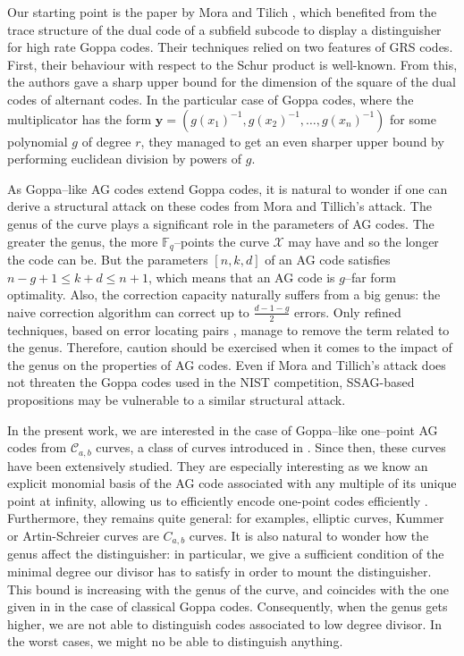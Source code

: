 \documentclass[a4paper]{article}
\theoremstyle{definition}
\theoremstyle{remark}
\newcommand{\calC}{\mathcal{C}}
\newcommand{\calX}{\mathcal{X}}
\newcommand{\F}{\mathbb{F}}
\begin{document}
Our starting point is the paper by Mora and Tilich \cite{MT21}, which benefited from the trace structure of the dual code of a subfield subcode to display a distinguisher for high rate Goppa codes. Their techniques relied on two features of GRS codes. First, their behaviour with respect to the Schur product is well-known. From this, the authors gave a sharp upper bound for the dimension of the square of the dual codes of alternant codes. In the particular case of Goppa codes, where the multiplicator has the form $\mathbf{y}=(g(x_1)^{-1},g(x_2)^{-1},\dots,g(x_n)^{-1})$ for some polynomial $g$ of degree $r$, they managed to get an even sharper upper bound by performing euclidean division by powers of $g$.

As Goppa--like AG codes extend Goppa codes, it is natural to wonder if one can derive a structural attack on these codes from Mora and Tillich's attack. The genus of the curve plays a significant role in the parameters of AG codes. The greater the genus, the more $\F_q$--points the curve $\calX$ may have and so the longer the code can be. But the parameters $[n,k,d]$ of an AG code satisfies $n-g+1 \leq k+d \leq n+1$, which means that an AG code is $g$--far form optimality. Also, the correction capacity naturally suffers from a big genus: the naive correction algorithm can correct up to $\frac{d-1-g}{2}$ errors. Only refined techniques, based on error locating pairs \cite{CP20}, manage to remove the term related to the genus. Therefore, caution should be exercised when it comes to the impact of the genus on the properties of AG codes.
Even if Mora and Tillich's attack does not threaten the Goppa codes used in the NIST competition, SSAG-based propositions may be vulnerable to a similar structural attack. 

In the present work, we are interested in the case of Goppa--like one--point AG codes from $\calC_{a,b}$ curves, a class of curves introduced in \cite{Miu93}. Since then, these curves have been extensively studied. They are especially interesting as we know an explicit monomial basis of the AG code associated with any multiple of its unique point at infinity, allowing us to efficiently encode one-point codes  efficiently \cite{BRS21}. Furthermore, they remains quite general: for examples, elliptic curves, Kummer or Artin-Schreier curves are $C_{a,b}$ curves. It is also natural to wonder how the genus affect the distinguisher: in particular, we give a sufficient condition of the minimal degree our divisor has to satisfy in order to mount the distinguisher. This bound is increasing with the genus of the curve, and coincides with the one given in \cite{MT21} in the case of classical Goppa codes. Consequently, when the genus gets higher, we are not able to distinguish codes associated to low degree divisor. In the worst cases, we might no be able to distinguish anything.
\end{document}
